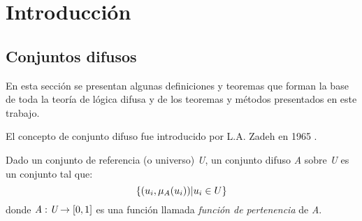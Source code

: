 \chapter{Introducción}
\label{cha:introduccion}
\section{Conjuntos difusos}
En esta sección se presentan algunas definiciones y teoremas que forman la base de toda la teoría de lógica difusa y de los teoremas y métodos presentados en este trabajo.

El concepto de conjunto difuso fue introducido por L.A. Zadeh en 1965 \cite{Zadeh65}.
\begin{definition}
Dado un conjunto de referencia (o universo) \emph{U}, un conjunto difuso \emph{A} sobre \emph{U} es un conjunto tal que:\\
\begin{equation}
\{(u_{i},\mu_{A}(u_{i}))\arrowvert u_{i} \in U\}
\end{equation}
donde \begin{math}\emph{A}:\emph{U}\rightarrow[0,1]\end{math} es una función llamada \emph{función de pertenencia} de \emph{A}.
\end{definition}

